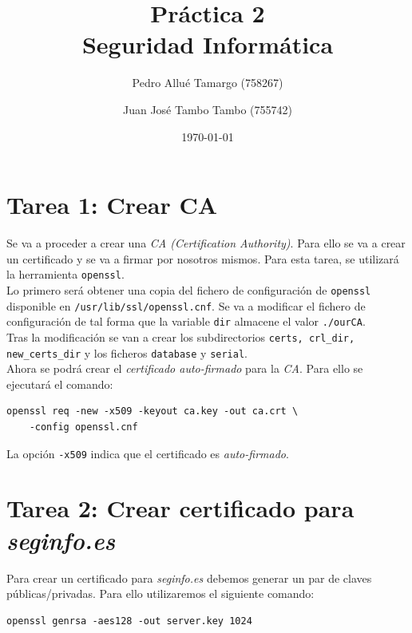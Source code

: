 \documentclass[10pt,a4paper]{article}
\begin{document}
\begin{titlepage}
\title{\textbf{\Huge{Práctica 2}\\
	\large{Seguridad Informática}
}}
\author{
	Pedro Allué Tamargo (758267)
	\and
	Juan José Tambo Tambo (755742)
}
\date{\today}
\clearpage\maketitle
\thispagestyle{empty}
\tableofcontents
\end{titlepage}

\section{Tarea 1: Crear CA}

Se va a proceder a crear una \emph{CA (Certification Authority)}. Para ello se va a crear un certificado y se va a firmar por nosotros mismos. Para esta tarea, se utilizará la herramienta \texttt{openssl}.\\
Lo primero será obtener una copia del fichero de configuración de \texttt{openssl} disponible en \texttt{/usr/lib/ssl/openssl.cnf}. Se va a modificar el fichero de configuración de tal forma que la variable \texttt{dir} almacene el valor \texttt{./ourCA}.\\
Tras la modificación se van a crear los subdirectorios \texttt{certs, crl\_{}dir, new\_{}certs\_{}dir} y los ficheros \texttt{database} y \texttt{serial}.\\

Ahora se podrá crear el \emph{certificado auto-firmado} para la \emph{CA}. Para ello se ejecutará el comando:

\begin{lstlisting}
openssl req -new -x509 -keyout ca.key -out ca.crt \
	-config openssl.cnf
\end{lstlisting}

La opción \texttt{-x509} indica que el certificado es \emph{auto-firmado}.


\section{Tarea 2: Crear certificado para \emph{seginfo.es}}

Para crear un certificado para \emph{seginfo.es} debemos generar un par de claves públicas/privadas. Para ello utilizaremos el siguiente comando:

\begin{lstlisting}
openssl genrsa -aes128 -out server.key 1024
\end{lstlisting}
\end{document}
